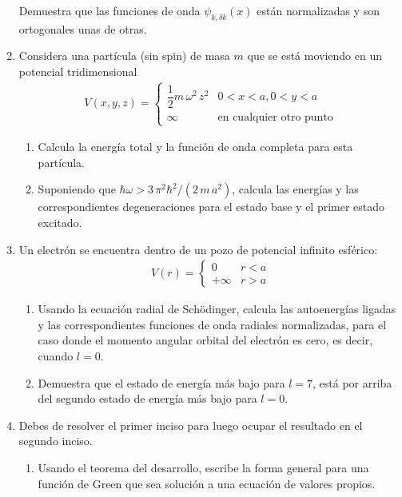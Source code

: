 \begin{enumerate}
Demuestra que las funciones de onda $\psi_{k, \delta k} (x)$ están normalizadas y son ortogonales unas de otras.
\item Considera una partícula (sin spin) de masa $m$ que se está moviendo en un potencial tridimensional
\begin{align*}
V(x, y, z) = \begin{cases}
\dfrac{1}{2} m \, \omega^{2} \, z^{2} & 0 < x < a, 0 < y < a \\
\infty & \mbox{en cualquier otro punto}
\end{cases}
\end{align*}
\begin{enumerate}
\item Calcula la energía total y la función de onda completa para esta partícula.
\item Suponiendo que $\hbar \omega > 3 \, \pi^{2} \hbar^{2} / (2 \, m \, a^{2})$, calcula las energías y las correspondientes degeneraciones para el estado base y el primer estado excitado.
\end{enumerate}
\item Un electrón se encuentra dentro de un pozo de potencial infinito esférico:
\begin{align*}
V(r) = \begin{cases}
0 & r < a \\
+\infty & r > a
\end{cases}
\end{align*}
\begin{enumerate}
\item Usando la ecuación radial de Schödinger, calcula las autoenergías ligadas y las correspondientes funciones de onda radiales normalizadas, para el caso donde el momento angular orbital del electrón es cero, es decir, cuando $l = 0$.
\item Demuestra que el estado de energía más bajo para $l = 7$, está por arriba del segundo estado de energía más bajo para $l = 0$.
\end{enumerate}
\item Debes de resolver el primer inciso para luego ocupar el resultado en el segundo inciso.
\begin{enumerate}
\item Usando el teorema del desarrollo, escribe la forma general para una función de Green que sea solución a una ecuación de valores propios.

\end{enumerate}
\end{enumerate}
